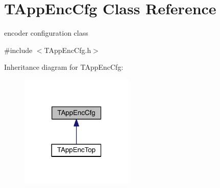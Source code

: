 \hypertarget{class_t_app_enc_cfg}{}\section{T\+App\+Enc\+Cfg Class Reference}
\label{class_t_app_enc_cfg}


encoder configuration class  




{\ttfamily \#include $<$T\+App\+Enc\+Cfg.\+h$>$}



Inheritance diagram for T\+App\+Enc\+Cfg\+:
\nopagebreak
\begin{figure}[H]
\begin{center}
\leavevmode
\includegraphics[width=153pt]{d7/d50/class_t_app_enc_cfg__inherit__graph}
\end{center}
\end{figure}


